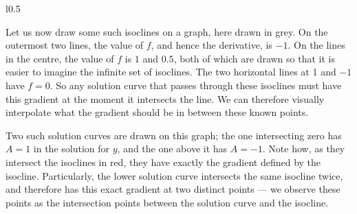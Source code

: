 \begin{wrapfigure}{l}{0.5\textwidth}
\end{wrapfigure}

Let us now draw some such isoclines on a graph, here drawn in grey.
On the outermost two lines, the value of \(f\), and hence the derivative, is \(-1\).
On the lines in the centre, the value of \(f\) is \(1\) and \(0.5\), both of which are drawn so that it is easier to imagine the infinite set of isoclines.
The two horizontal lines at 1 and \(-1\) have \(f=0\).
So any solution curve that passes through these isoclines must have this gradient at the moment it intersects the line.
We can therefore visually interpolate what the gradient should be in between these known points.

Two such solution curves are drawn on this graph; the one intersecting zero has \(A = 1\) in the solution for \(y\), and the one above it has \(A = -1\).
Note how, as they intersect the isoclines in red, they have exactly the gradient defined by the isocline.
Particularly, the lower solution curve intersects the same isocline twice, and therefore has this exact gradient at two distinct points --- we observe these points as the intersection points between the solution curve and the isocline.


